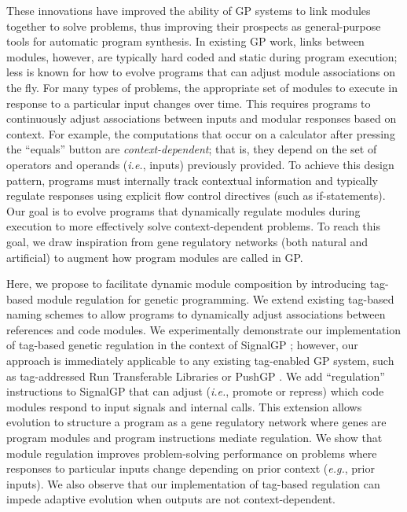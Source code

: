 These innovations have improved the ability of GP systems to link modules together to solve problems, thus improving their prospects as general-purpose tools for automatic program synthesis.
In existing GP work, links between modules, however, are typically hard coded and static during program execution; 
less is known for how to evolve programs that can adjust module associations on the fly.
For many types of problems, the appropriate set of modules to execute in response to a particular input changes over time.
This requires programs to continuously adjust associations between inputs and modular responses based on context.
For example, the computations that occur on a calculator after pressing the ``equals'' button are \textit{context-dependent}; that is, they depend on the set of operators and operands (\textit{i.e.}, inputs) previously provided. 
To achieve this design pattern, programs must internally track contextual information and typically regulate responses using explicit flow control directives (such as if-statements).
Our goal is to evolve programs that dynamically regulate modules during execution to more effectively solve context-dependent problems.  
To reach this goal, we draw inspiration from gene regulatory networks (both natural and artificial) to augment how program modules are called in GP.

Here, we propose to facilitate dynamic module composition by introducing tag-based module regulation for genetic programming. 
We extend existing tag-based naming schemes to allow programs to dynamically adjust associations between references and code modules. 
We experimentally demonstrate our implementation of tag-based genetic regulation in the context of SignalGP \citep{lalejini_evolving_2018}; however, our approach is immediately applicable to any existing tag-enabled GP system, such as tag-addressed Run Transferable Libraries \citep{keijzer_run_2004} or PushGP \citep{spector_tag-based_2011}.
We add ``regulation'' instructions to SignalGP that can adjust (\textit{i.e.}, promote or repress) which code modules respond to input signals and internal calls.
This extension allows evolution to structure a program as a gene regulatory network where genes are program modules and program instructions mediate regulation.
We show that module regulation improves problem-solving performance on problems where responses to particular inputs change depending on prior context (\textit{e.g.}, prior inputs). 
We also observe that our implementation of tag-based regulation can impede adaptive evolution when outputs are not context-dependent. 
